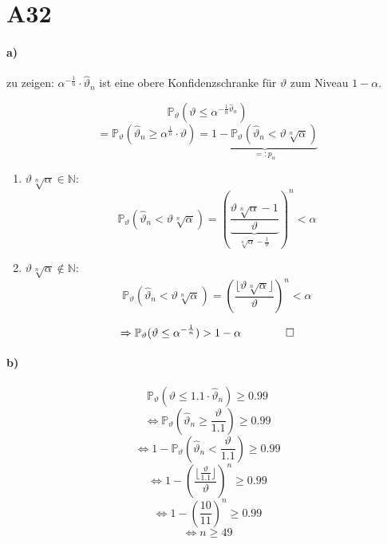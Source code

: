 \documentclass[a4paper,11pt,notitlepage]{report}
\newcommand{\N}{{\ensuremath{\mathbb{N}}}}
\newcommand{\Prim}{{\ensuremath{\mathbb{P}}}}
\begin{document}
 
 \section{A32}
 \paragraph{a)}
 zu zeigen: $\alpha^{-\frac{1}{n}} \cdot \hat{\vartheta}_n$ ist eine obere Konfidenzschranke für $\vartheta$ zum Niveau $1-\alpha$.
 
 $$\Prim_\vartheta(\vartheta \leq \alpha^{-\frac{1}{n} \hat{\vartheta}_n})$$
 $$= \Prim_\vartheta(\hat{\vartheta}_n \geq \alpha^{\frac{1}{n}} \cdot \vartheta) = \underbrace{1 - \Prim_\vartheta(\hat{\vartheta}_n < \vartheta \sqrt[n]{\alpha})}_{=: p_\alpha}$$
 
 \begin{enumerate}
 	\item $\vartheta \sqrt[n]{\alpha} \in \N \colon$
 	$$\Prim_\vartheta(\hat{\vartheta}_n < \vartheta \sqrt[n]{\alpha}) = \left(\underbrace{\frac{\vartheta \sqrt[n]{\alpha}-1}{\vartheta}}_{\sqrt[n]{\alpha} - \frac{1}{\vartheta}}\right )^n < \alpha$$
 	\item $\vartheta \sqrt[n]{\alpha} \notin \N \colon$
 	$$\Prim_\vartheta(\hat{\vartheta}_n < \vartheta \sqrt[n]{\alpha}) = \left(\frac{\lfloor \vartheta \sqrt[n]{\alpha} \rfloor}{\vartheta}\right)^n < \alpha$$
 \end{enumerate}
 
 $$\Rightarrow \Prim_\vartheta(\vartheta \leq \alpha^{-\frac{1}{n}}) > 1- \alpha \qquad \qed$$
 
 \paragraph{b)}
 $$\Prim_\vartheta(\vartheta \leq 1.1 \cdot \hat{\vartheta}_n) \geq 0.99$$
 $$\Leftrightarrow \Prim_\vartheta(\hat{\vartheta}_n \geq \frac{\vartheta}{1.1}) \geq 0.99$$
 $$\Leftrightarrow 1- \Prim_\vartheta(\hat{\vartheta}_n < \frac{\vartheta}{1.1}) \geq 0.99$$
 $$\Leftrightarrow 1- \left(\frac{\lfloor\frac{\vartheta}{1.1}\rfloor}{\vartheta} \right)^n \geq 0.99$$
 $$\Leftrightarrow 1 - \left(\frac{10}{11}\right)^n \geq 0.99$$
 $$\Leftrightarrow n \geq 49$$
 
\end{document}
